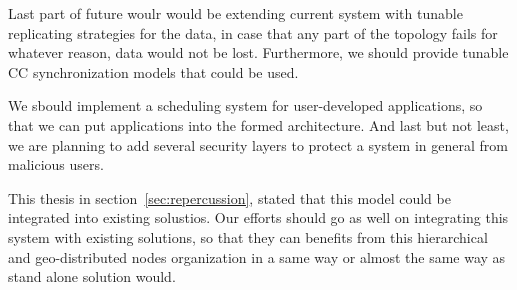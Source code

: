 Last part of future woulr would be extending current system with tunable replicating strategies for the data, in case that any part of the topology fails for whatever reason, data would not be lost. Furthermore, we should provide tunable CC synchronization models that could be used.

We sbould implement a scheduling system for user-developed applications, so that we can put applications into the formed architecture. And last but not least, we are planning to add several security layers to protect a system in general from malicious users.

This thesis in section~\ref{sec:repercussion}, stated that this model could be integrated into existing solustios. Our efforts should go as well on integrating this system with existing solutions, so that they can benefits from this hierarchical and geo-distributed nodes organization in a same way or almost the same way as stand alone solution would.
%
%
